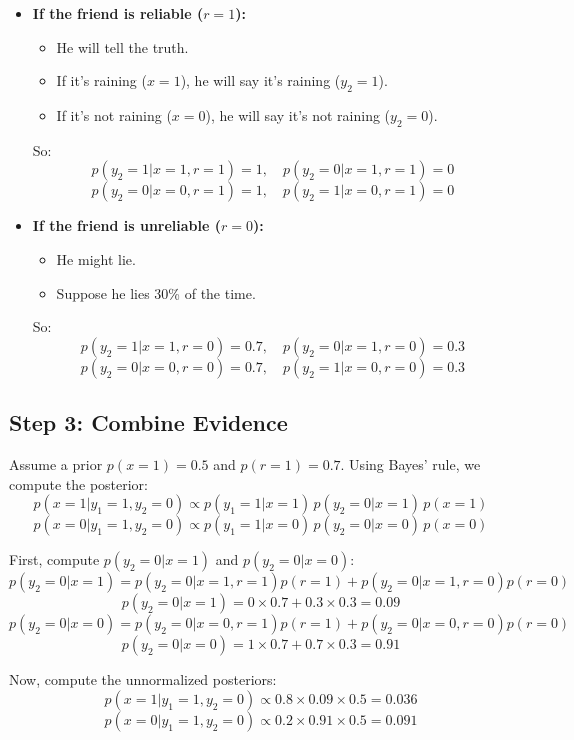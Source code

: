 \begin{notechapter}
\begin{itemize}
    \item \textbf{If the friend is reliable (\( r = 1 \)):}
    \begin{itemize}
        \item He will tell the truth.
        \item If it's raining (\( x = 1 \)), he will say it's raining (\( y_2 = 1 \)).
        \item If it's not raining (\( x = 0 \)), he will say it's not raining (\( y_2 = 0 \)).
    \end{itemize}
    So:
    \[
    p(y_2 = 1 | x = 1, r = 1) = 1, \quad p(y_2 = 0 | x = 1, r = 1) = 0
    \]
    \[
    p(y_2 = 0 | x = 0, r = 1) = 1, \quad p(y_2 = 1 | x = 0, r = 1) = 0
    \]

    \item \textbf{If the friend is unreliable (\( r = 0 \)):}
    \begin{itemize}
        \item He might lie.
        \item Suppose he lies 30\% of the time.
    \end{itemize}
    So:
    \[
    p(y_2 = 1 | x = 1, r = 0) = 0.7, \quad p(y_2 = 0 | x = 1, r = 0) = 0.3
    \]
    \[
    p(y_2 = 0 | x = 0, r = 0) = 0.7, \quad p(y_2 = 1 | x = 0, r = 0) = 0.3
    \]
\end{itemize}

\subsection{Step 3: Combine Evidence}
Assume a prior \( p(x = 1) = 0.5 \) and \( p(r = 1) = 0.7 \). Using
Bayes' rule, we compute the posterior:
\[
p(x = 1 | y_1 = 1, y_2 = 0) \propto p(y_1 = 1 | x = 1) \,
p(y_2 = 0 | x = 1) \, p(x = 1)
\]
\[
p(x = 0 | y_1 = 1, y_2 = 0) \propto p(y_1 = 1 | x = 0) \,
p(y_2 = 0 | x = 0) \, p(x = 0)
\]

First, compute \( p(y_2 = 0 | x = 1) \) and \( p(y_2 = 0 | x = 0) \):
\[
p(y_2 = 0 | x = 1) = p(y_2 = 0 | x = 1, r = 1) p(r = 1) +
p(y_2 = 0 | x = 1, r = 0) p(r = 0)
\]
\[
p(y_2 = 0 | x = 1) = 0 \times 0.7 + 0.3 \times 0.3 = 0.09
\]
\[
p(y_2 = 0 | x = 0) = p(y_2 = 0 | x = 0, r = 1) p(r = 1) +
p(y_2 = 0 | x = 0, r = 0) p(r = 0)
\]
\[
p(y_2 = 0 | x = 0) = 1 \times 0.7 + 0.7 \times 0.3 = 0.91
\]

Now, compute the unnormalized posteriors:
\[
p(x = 1 | y_1 = 1, y_2 = 0) \propto 0.8 \times 0.09 \times 0.5 = 0.036
\]
\[
p(x = 0 | y_1 = 1, y_2 = 0) \propto 0.2 \times 0.91 \times 0.5 = 0.091
\]


\end{notechapter}

